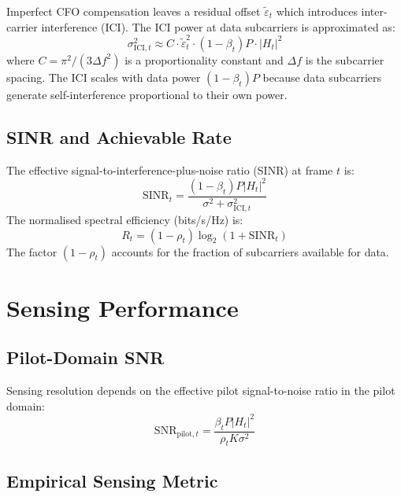 Imperfect CFO compensation leaves a residual offset $\tilde{\varepsilon}_t$ which introduces inter-carrier interference (ICI). The ICI power at data subcarriers is approximated as:
\begin{equation}
    \sigma^2_{\text{ICI},t} \approx C \cdot \tilde{\varepsilon}_t^2 \cdot (1-\beta_t)P \cdot |H_t|^2
    \label{eq:ici_power}
\end{equation}
where $C = \pi^2 / (3\Delta f^2)$ is a proportionality constant and $\Delta f$ is the subcarrier spacing. The ICI scales with data power $(1-\beta_t)P$ because data subcarriers generate self-interference proportional to their own power.

\subsection{SINR and Achievable Rate}

The effective signal-to-interference-plus-noise ratio (SINR) at frame $t$ is:
\begin{equation}
    \text{SINR}_t = \frac{(1-\beta_t)P|H_t|^2}{\sigma^2 + \sigma^2_{\text{ICI},t}}
    \label{eq:sinr}
\end{equation}
The normalised spectral efficiency (bits/s/Hz) is:
\begin{equation}
    R_t = (1-\rho_t)\log_2(1+\text{SINR}_t)
    \label{eq:rate}
\end{equation}
The factor $(1-\rho_t)$ accounts for the fraction of subcarriers available for data.

\section{Sensing Performance}

\subsection{Pilot-Domain SNR}

Sensing resolution depends on the effective pilot signal-to-noise ratio in the pilot domain:
\begin{equation}
    \text{SNR}_{\text{pilot},t} = \frac{\beta_t P |H_t|^2}{\rho_t K \sigma^2}
    \label{eq:pilot_snr}
\end{equation}

\subsection{Empirical Sensing Metric}

